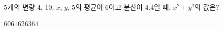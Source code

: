 $5$개의 변량 $4$, $10$, $x$, $y$, $5$의 평균이 $6$이고 분산이 $4.4$일 때, $x^2+y^2$의 값은?
\begin{choices32}{$60$}{$61$}{$62$}{$63$}{$64$}\end{choices32}
